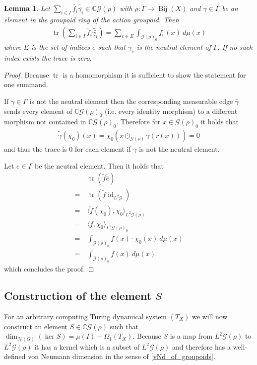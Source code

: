 \documentclass[12pt,a4paper]{scrartcl}
\theoremstyle{plain}
\newtheorem{Lemma}[Theorem]{Lemma}
\theoremstyle{definition}
\newcommand{\C}{\mathbb{C}} %
\newcommand{\2}{\mathbb{Z} / 2 \mathbb{Z}}
\newcommand{\G}{\mathcal{G}}
\newcommand{\1}{\bar{1}}
\newcommand{\0}{\bar{0}}
\newcommand{\Bij}{\operatorname{Bij}}
\newcommand{\tr}{\operatorname{tr}}
\newcommand{\id}{\operatorname{id}}
\begin{document}
\begin{Lemma} \label{trgroupoid}
	Let $\sum_{i \in I}  \widetilde{f_i} \widetilde{\bar{\gamma_i}} \in \C\G(\rho)$ with $\rho\colon\Gamma \to \Bij(X)$ and $\gamma \in \Gamma$ be an element in the groupoid ring of the action groupoid. Then
	\begin{align*}
	\tr(\sum_{i \in I} \widetilde{f_i} \widetilde{\bar{\gamma_i}} ) = \sum_{e \in E} \int_{\G(\rho)_0} f_e(x) ~ d\mu(x)
	\end{align*}
	where $E$ is the set of indices $e$ such that $\gamma_e$ is the neutral element of $\Gamma$. If no such index exists the trace is zero.
\end{Lemma}
\begin{proof} 
	Because $\tr$ is a homomorphism it is sufficient to show the statement for one summand.
	
	If $\gamma \in \Gamma$ is not the neutral element then the corresponding measurable edge $\bar{\gamma}$ sends every element of $\C\G(\rho)_0$ (i.e. every identity morphism) to a different morphism not contained in $\C\G(\rho)_0$. Therefore for $x \in \G(\rho)_0$ it holds that
	\begin{align*}
		\widetilde{\bar{\gamma}}(\chi_0)(x) = \chi_0(x \odot_{\G(\rho)} \bar{\gamma}(r(x))) = 0
	\end{align*}
	and thus the trace is $0$ for each element if $\gamma$ is not the neutral element.
	
	Let $e \in \Gamma$ be the neutral element. Then it holds that
	\begin{align*}
	&~ \tr(\tilde{f} \widetilde{\bar{e}} ) \\
	=&~ \tr(\tilde{f} \id_{L^2 \G} ) \\
	=&~ \langle \tilde{f} (\chi_0), \chi_0 \rangle_{L^2 \G(\rho)} \\
	=&~ \langle f, \chi_0 \rangle_{L^2 \G(\rho)_0} \\
	=&~ \int_{\G(\rho)_0} f(x) \cdot \chi_0(x) ~ d\mu(x) \\
	=&~ \int_{\G(\rho)_0} f(x) ~ d\mu(x)
	\end{align*}
	which concludes the proof.
\end{proof}


\subsection{Construction of the element $S$}
For an arbitrary computing Turing dynamical system $(T_X)$ we will now construct an element $S \in \C \G (\rho)$ such that $\dim_{\mathcal{N}(G)}(\ker S) = \mu(I) - \Omega_1(T_X)$. Because $S$ is a map from $L^2 \G (\rho)$ to $L^2 \G (\rho)$ it has a kernel which is a subset of $L^2 \G (\rho)$ and therefore has a well-defined von Neumann dimension in the sense of \ref{vNd_of_groupoids}.
\end{document}
